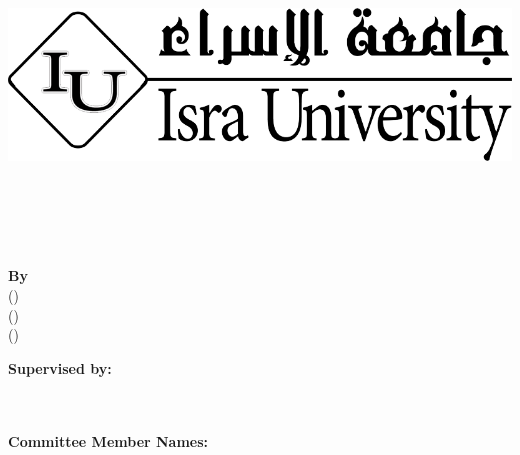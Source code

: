\begin{titlepage}
\begin{center}

\vspace*{1in}

\begin{center}
    \includegraphics[width=0.7\columnwidth, keepaspectratio]{img/logo.png}\\
\end{center}

\vspace{\baselineskip}
\textbf{\LARGE{\MakeUppercase{\universityName}}}\\
\vspace{\baselineskip}

\vfill

\textbf{\LARGE{{\thesisTitle}}}\\
\vspace{\baselineskip}
\thesisSubTitle\\
\vspace{\baselineskip}

\textbf{By}\\
\vspace{\baselineskip}
\firstStudent{} (\firstStudentID)\\
\secondStudent{} (\secondStudentID)\\
\thirdStudent{} (\thirdStudentID)\\
\vspace{\baselineskip}

\textbf{Supervised by:}\\
\vspace{\baselineskip}
\supervisor\\
\coSupervisor\\
\vspace{\baselineskip}

\textbf{Committee Member Names:}\\
\vspace{\baselineskip}
\firstCommittee\\
\secondCommittee\\
\vspace{\baselineskip}

\vspace{\baselineskip}
\docMonth{} \docYear{}\\
\vspace{\baselineskip}

\end{center}
\end{titlepage}